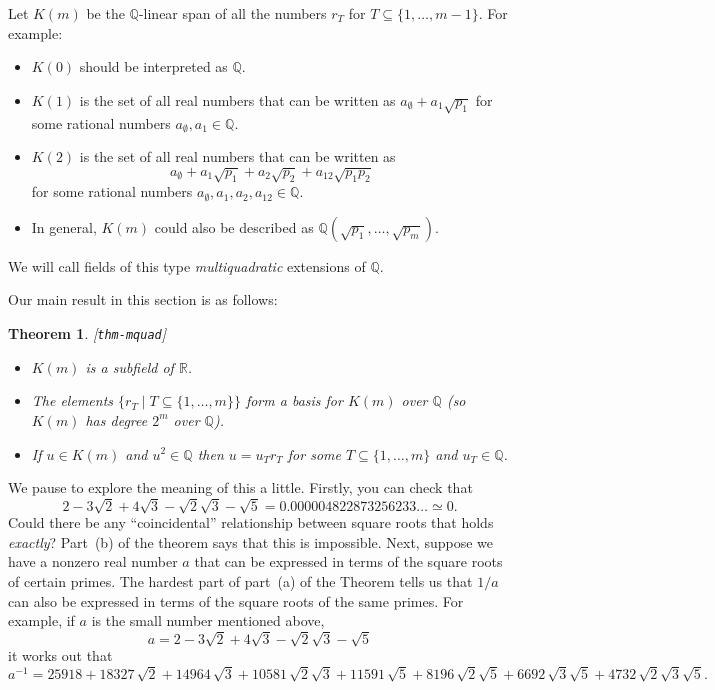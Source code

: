 \documentclass{amsart}
\newcommand{\lbl}[1]{\label{#1}\textup{[\texttt{#1}]}\ \\}
\newcommand{\lbl}{\label}
\newcommand{\Q}         {{\mathbb{Q}}}
\newcommand{\R}         {{\mathbb{R}}}
\newcommand{\st}        {\;|\;}
\newcommand{\sse}       {\subseteq}
\renewcommand{\:}{\colon}
\newtheorem{theorem}{Theorem}[section]
\theoremstyle{definition}
\begin{document}
Let $K(m)$ be the $\Q$-linear span of all the
numbers $r_T$ for $T\sse\{1,\dotsc,m-1\}$.  For example:
\begin{itemize}
 \item $K(0)$ should be interpreted as $\Q$.
 \item $K(1)$ is the set of all real numbers that can be written as
  $a_\emptyset+a_1\sqrt{p_1}$ for some rational numbers
  $a_\emptyset,a_1\in\Q$. 
 \item $K(2)$ is the set of all real numbers that can be written as
  \[ a_\emptyset+a_1\sqrt{p_1}+a_2\sqrt{p_2}+a_{12}\sqrt{p_1p_2} \]
  for some rational numbers $a_\emptyset,a_1,a_2,a_{12}\in\Q$.
 \item In general, $K(m)$ could also be described as
  $\Q(\sqrt{p_1},\dotsc,\sqrt{p_m})$.  
\end{itemize}
We will call fields of this type \emph{multiquadratic} extensions of
$\Q$. 

Our main result in this section is as follows:
\begin{theorem}\lbl{thm-mquad}
 \begin{itemize}
  \item[(a)] $K(m)$ is a subfield of $\R$.
  \item[(b)] The elements $\{r_T\st T\sse\{1,\dotsc,m\}\}$ form a
   basis for $K(m)$ over $\Q$ (so $K(m)$ has degree $2^m$ over $\Q$).
  \item[(c)] If $u\in K(m)$ and $u^2\in\Q$ then $u=u_Tr_T$ for some
   $T\sse\{1,\dotsc,m\}$ and $u_T\in\Q$.
 \end{itemize}
\end{theorem}

We pause to explore the meaning of this a little.  Firstly, you can
check that 
\[ 2 - 3 \sqrt{2} + 4\sqrt{3} -\sqrt{2}\sqrt{3} - \sqrt{5} = 
    0.000004822873256233\dotsc \simeq 0.
\]
Could there be any ``coincidental'' relationship between square roots
that holds \emph{exactly}?  Part~(b) of the theorem says that this is
impossible.  Next, suppose we have a nonzero real number $a$ that can
be expressed in terms of the square roots of certain primes.  The
hardest part of part~(a) of the Theorem tells us that $1/a$ can also
be expressed in terms of the square roots of the same primes.  For
example, if $a$ is the small number mentioned above,
\[ a = 2 - 3 \sqrt{2} + 4\sqrt{3} -\sqrt{2}\sqrt{3} - \sqrt{5} \]
it works out that
\[ a^{-1} = 
   25918+18327\,\sqrt{2}+14964\,\sqrt{3}+10581\,\sqrt{2}\sqrt{3}+
   11591\,\sqrt{5}+8196\,\sqrt{2}\sqrt{5}+6692\,\sqrt{3}\sqrt{5}+
   4732\,\sqrt{2}\sqrt{3}\sqrt{5}.
\]
\end{document}
